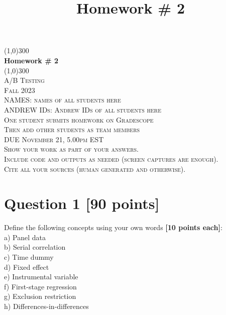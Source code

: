 \documentclass{article}
\title{Homework \# 2}
\begin{document}
\begin{titlepage}
	\begin{center}
    \line(1,0){300}\\
    [0.65cm]
	\huge{\bfseries Homework \# 2}\\
	\line(1,0){300}\\
	\textsc{\LARGE A/B Testing}\\
	\textsc{\LARGE  Fall 2023}\\
	[5.5cm]
	\textsc{\LARGE NAMES: names of all students here}\\
	\textsc{\LARGE ANDREW IDs: Andrew IDs of all students here}\\
	[1.5cm]
	\textsc{\LARGE One student submits homework on Gradescope}\\
	\textsc{\LARGE Then add other students as team members}\\
	[5.5cm]
	\textsc{DUE November 21, 5.00pm EST}\\
	[0.5cm]
	\textsc{\large Show your work as part of your answers.\\Include code and outputs as needed (screen captures are enough).\\Cite all your sources (human generated and otherwise).}\\
	\end{center}
\end{titlepage}

\section*{\color{black} Question 1 {\bf [90 points]}}

Define the following concepts using your own words {\bf [10 points each]}:\\

a) Panel data\\

b) Serial correlation\\

c) Time dummy\\

d) Fixed effect\\

e) Instrumental variable\\

f) First-stage regression\\

g) Exclusion restriction\\

h) Differences-in-differences\\
\end{document}
